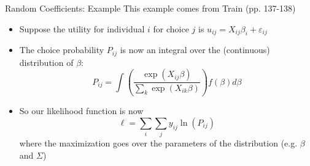 \documentclass[english,xcolor=dvipsnames]{beamer}
\begin{document}
\begin{frame}{Random Coefficients: Example}
This example comes from Train (pp. 137-138)
\begin{itemize}
	\item Suppose the utility for individual $i$ for choice $j$ is $u_{ij} = X_{ij}\beta_{i}+\varepsilon_{ij}$
	\item The choice probability $P_{ij}$ is now an integral over the (continuous) distribution of $\beta$:
	\[
	P_{ij} = \int \left(\frac{\exp(X_{ij}\beta)}{\sum_{k} \exp(X_{ik}\beta)}\right) f(\beta) d\beta
	\]
	\item So our likelihood function is now
	\[
	\ell = \sum_{i} \sum_{j} y_{ij}\ln \left(P_{ij}\right)
	\]
	where the maximization goes over the parameters of the distribution (e.g. $\beta$ and $\Sigma$)
\end{itemize}
\end{frame}
\end{document}
